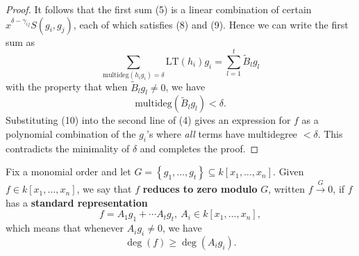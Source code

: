 \begin{proof}
  It follows that the first sum (5) is a linear combination of certain $x^{\delta - \gamma_{ij}} S(g_i, g_j)$, each of which satisfies (8) and (9). Hence we can write the first sum as
  \begin{equation} \tag{10}
  \sum_{\text{multideg}(h_i g_i) = \delta} \text{LT}(h_i) g_i = \sum_{l=1}^t \tilde{B}_l g_l
  \end{equation}
  with the property that when $\tilde{B}_l g_l \ne 0$, we have
  \begin{equation} \tag{11}
  \text{multideg}(\tilde{B}_l g_l) < \delta.
  \end{equation}
  Substituting (10) into the second line of (4) gives an expression for $f$ as a polynomial combination of the $g_i$'s where \textit{all} terms have multidegree $<\delta$. This contradicts the minimality of $\delta$ and completes the proof.
\end{proof}

\begin{definition}\label{def:reduces_to_zero} %
    Fix a monomial order and let $G = \left\{g_1, \ldots , g_t\right\} \subseteq k[x_1, \ldots , x_n]$.
    Given $f \in k[x_1, \ldots , x_n]$, we say that $f$ \textbf{reduces to zero modulo} $G$, written $f \xrightarrow{G} 0$,
    if $f$ has a \textbf{standard representation}
    \[ f = A_1g_1 + \cdots A_tg_t,\ A_i \in k[x_1, \ldots , x_n],\]
    which means that whenever $A_ig_i \neq 0$, we have
    \[\operatorname{deg}(f) \geq \operatorname{deg}(A_ig_i).\]
\end{definition}

